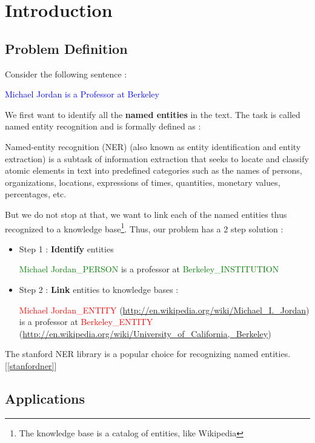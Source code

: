 \chapter{Introduction}
\section{Problem Definition}
Consider the following sentence : 

 \begin{center}
\textcolor{blue}{Michael Jordan is a Professor at Berkeley}
   \end{center}

 We first want to identify all the \textbf{named entities} in the text. The task is called named entity recognition and is 
 formally defined as : 
 \begin{mydef}
 \label{nerdef}
   Named-entity recognition (NER) (also known as entity identification and entity extraction) is a subtask of information extraction that seeks to locate and classify 
   atomic elements in text into predefined categories such as the names of persons, organizations, locations, expressions of times, quantities, monetary values, percentages, etc.
  \end{mydef}
 But we do not stop at that, we want to link each of the named entities thus recognized to a knowledge base\footnote{The knowledge base is a catalog of entities, like Wikipedia}.
 Thus, our problem has a 2 step solution : 

 \begin{itemize}  
  \item Step 1 : \textbf{Identify} entities
  \medskip
  
  \textcolor{green}{Michael Jordan\_PERSON} is a professor at \textcolor{green}{Berkeley\_INSTITUTION} \medskip
  \item Step 2 : \textbf{Link} entities to knowledge bases : 
  \medskip
  
  \textcolor{red}{Michael Jordan\_ENTITY} (\url{http://en.wikipedia.org/wiki/Michael_I._Jordan})  is a professor at  
  \textcolor{red}{Berkeley\_ENTITY} (\url{http://en.wikipedia.org/wiki/University_of_California,_Berkeley})
\end{itemize}

The stanford NER library is a popular choice for recognizing named entities. [\ref{stanfordner}]

\section{Applications}


